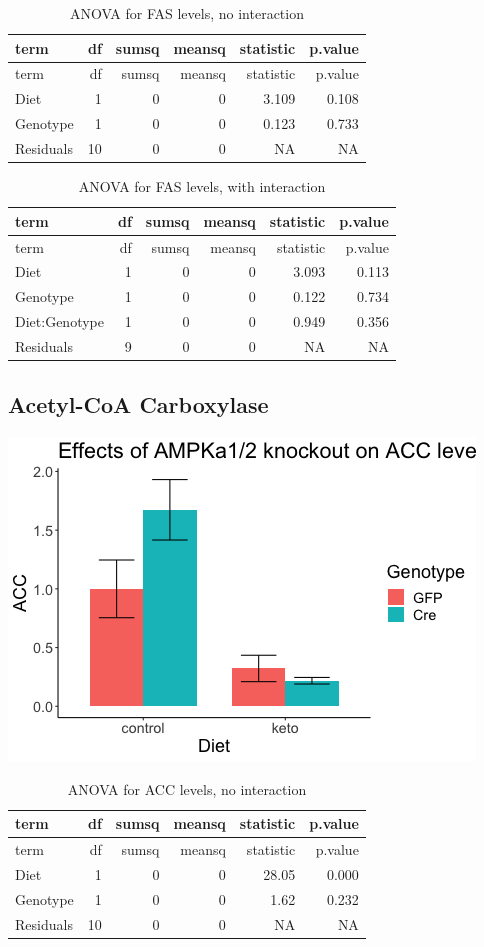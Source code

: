 \documentclass[
]{article}
\begin{document}
\begin{longtable}[]{@{}lrrrrr@{}}
\caption{ANOVA for FAS levels, no interaction}\tabularnewline
\toprule
term & df & sumsq & meansq & statistic & p.value\tabularnewline
\midrule
\endfirsthead
\toprule
term & df & sumsq & meansq & statistic & p.value\tabularnewline
\midrule
\endhead
Diet & 1 & 0 & 0 & 3.109 & 0.108\tabularnewline
Genotype & 1 & 0 & 0 & 0.123 & 0.733\tabularnewline
Residuals & 10 & 0 & 0 & NA & NA\tabularnewline
\bottomrule
\end{longtable}

\begin{longtable}[]{@{}lrrrrr@{}}
\caption{ANOVA for FAS levels, with interaction}\tabularnewline
\toprule
term & df & sumsq & meansq & statistic & p.value\tabularnewline
\midrule
\endfirsthead
\toprule
term & df & sumsq & meansq & statistic & p.value\tabularnewline
\midrule
\endhead
Diet & 1 & 0 & 0 & 3.093 & 0.113\tabularnewline
Genotype & 1 & 0 & 0 & 0.122 & 0.734\tabularnewline
Diet:Genotype & 1 & 0 & 0 & 0.949 & 0.356\tabularnewline
Residuals & 9 & 0 & 0 & NA & NA\tabularnewline
\bottomrule
\end{longtable}

\hypertarget{acetyl-coa-carboxylase}{%
\subsection{Acetyl-CoA Carboxylase}\label{acetyl-coa-carboxylase}}

\includegraphics{figures/acc-barplot-1.png}

\begin{longtable}[]{@{}lrrrrr@{}}
\caption{ANOVA for ACC levels, no interaction}\tabularnewline
\toprule
term & df & sumsq & meansq & statistic & p.value\tabularnewline
\midrule
\endfirsthead
\toprule
term & df & sumsq & meansq & statistic & p.value\tabularnewline
\midrule
\endhead
Diet & 1 & 0 & 0 & 28.05 & 0.000\tabularnewline
Genotype & 1 & 0 & 0 & 1.62 & 0.232\tabularnewline
Residuals & 10 & 0 & 0 & NA & NA\tabularnewline
\bottomrule
\end{longtable}
\end{document}
